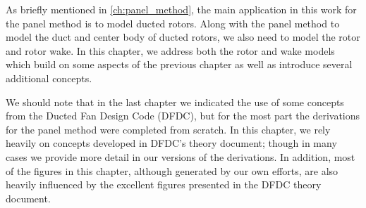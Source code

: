 As briefly mentioned in \cref{ch:panel_method}, the main application in this work for the panel method is to model ducted rotors.
%
Along with the panel method to model the duct and center body of ducted rotors, we also need to model the rotor and rotor wake.
%
In this chapter, we address both the rotor and wake models which build on some aspects of the previous chapter as well as introduce several additional concepts.

We should note that in the last chapter we indicated the use of some concepts from the Ducted Fan Design Code (DFDC), but for the most part the derivations for the panel method were completed from scratch.
%
In this chapter, we rely heavily on concepts developed in DFDC's theory document; though in many cases we provide more detail in our versions of the derivations.
%
In addition, most of the figures in this chapter, although generated by our own efforts, are also heavily influenced by the excellent figures presented in the DFDC theory document.

